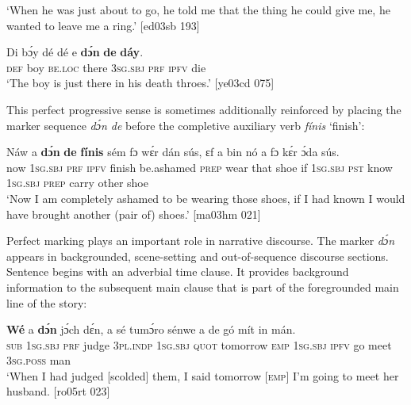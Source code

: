 \glt ‘When he was just about to go, he told me that the thing he could give me, 
he wanted to leave me a ring.’ [ed03sb 193]
\z


\ea%
    \label{ex:key:403}
    \gll Di  bɔ́y  dé    dé    e    \textbf{dɔ́n}  \textbf{de}  \textbf{dáy}.\\
\textsc{def}  boy  \textsc{be.loc}  there  \textsc{3sg.sbj}  \textsc{prf}  \textsc{ipfv}  die\\

\glt ‘The boy is just there in his death throes.’ [ye03cd 075]
\z

This perfect progressive sense is sometimes additionally reinforced by placing the marker sequence \textit{dɔ́n de} before the completive auxiliary verb \textit{fínis} ‘finish’: 


\ea%
    \label{ex:key:404}
    \gll Náw    a    \textbf{dɔ́n}    \textbf{de}  \textbf{fínis}  sém      fɔ  wɛ́r    dán    sús,
ɛf  a    bin  nó    a    fɔ  kɛ́r    ɔ́da    sús.\\
now    \textsc{1sg.sbj}  \textsc{prf}    \textsc{ipfv}  finish  be.ashamed  \textsc{prep}  wear  that    shoe
if  \textsc{1sg.sbj}  \textsc{pst}  know  \textsc{1sg.sbj}  \textsc{prep}  carry  other  shoe\\

\glt ‘Now I am completely ashamed to be wearing those shoes, if I had known
I would have brought another (pair of) shoes.’ [ma03hm 021]
\z

Perfect marking plays an important role in narrative discourse. The marker \textit{dɔ́n} appears in backgrounded, scene-setting and out-of-sequence discourse sections. Sentence  begins with an adverbial time clause. It provides background information to the subsequent main clause that is part of the foregrounded main line of the story:


\ea%
    \label{ex:key:405}
    \gll \textbf{Wé}  a    \textbf{dɔ́n}  jɔ́ch    dɛ́n,    a    sé    tumɔ́ro    sénwe
a    de  gó  mít  in    mán.\\
\textsc{sub}  \textsc{1sg.sbj}  \textsc{prf}  judge  \textsc{3pl.indp}  \textsc{1sg.sbj}  \textsc{quot}    tomorrow  \textsc{emp}
\textsc{1sg.sbj}  \textsc{ipfv}  go meet  \textsc{3sg.poss}  man\\

\glt ‘When I had judged [scolded] them, I said tomorrow \textsc{[emp]} 
I’m going to meet her husband. [ro05rt 023]
\z

